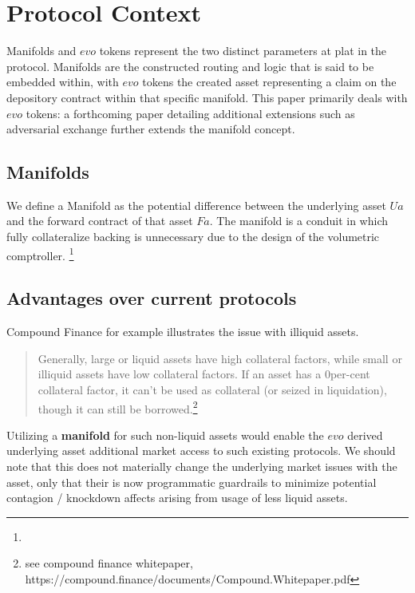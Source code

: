 \newpage


\section{Protocol Context}

Manifolds and $evo$ tokens represent the two distinct parameters at plat in the protocol. Manifolds are the constructed routing and logic that is said to be embedded  within, with $evo$ tokens the created asset representing a claim on the depository contract within that specific manifold. 
This paper primarily deals with $evo$ tokens: a forthcoming paper detailing additional extensions such as adversarial exchange further extends the manifold concept.


\subsection{Manifolds}
We define a Manifold as the  potential difference between the underlying asset $Ua$ and the forward contract of that asset $Fa$. The manifold is a conduit in which fully collateralize backing is unnecessary due to the design of the volumetric comptroller. \footnote{}

\subsection{Advantages over current protocols}

Compound Finance for example illustrates the issue with {illiquid assets}. 

\begin{quote}
	Generally, large or liquid assets have high collateral factors, while small or illiquid assets have low collateral factors. If an asset has a 0per-cent collateral factor, it can't be used as collateral (or seized in liquidation), though it can still be borrowed.\footnote{see compound finance whitepaper, https://compound.finance/documents/Compound.Whitepaper.pdf}
\end{quote}

Utilizing a \textbf{manifold} for such non-liquid assets would enable the $ evo $ derived underlying asset additional market access to such existing protocols. We should note that this does not materially change the underlying market issues with the asset, only that their is now programmatic guardrails to minimize potential contagion / knockdown affects arising from usage of less liquid  assets.




